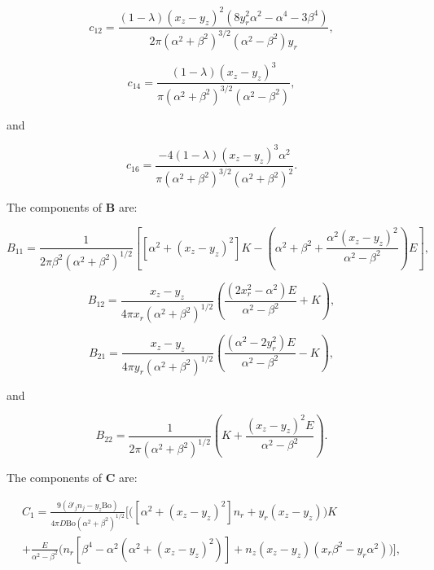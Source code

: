 \documentclass[12pt]{article}
\begin{document}
\begin{equation}
\label{equ:coeff_a12}
c_{12} = \frac{(1 - \lambda) (x_{z} - y_{z})^{2} (8 y_{r}^{2} \alpha^{2} - \alpha^{4} - 3 \beta^{4})}{2 \pi (\alpha^{2} + \beta^{2})^{3/2} (\alpha^{2} - \beta^{2}) y_{r}},
\end{equation}

\begin{equation}
\label{equ:coeff_a14}
c_{14} = \frac{(1 - \lambda) (x_{z} - y_{z})^{3}}{\pi (\alpha^{2} + \beta^{2})^{3/2} (\alpha^{2} - \beta^{2})},
\end{equation}

and 

\begin{equation}
\label{equ:coeff_a16}
c_{16} = \frac{-4 (1 - \lambda) (x_{z} - y_{z})^{3} \alpha^{2}}{\pi (\alpha^{2} + \beta^{2})^{3/2} (\alpha^{2} + \beta^{2})^{2}}.
\end{equation}

The components of $\boldsymbol{B}$ are:

\begin{equation}
\label{equ:B11_comp}
B_{11} = \frac{1}{2 \pi \beta^{2} (\alpha^{2} + \beta^{2})^{1/2}} \left[ [\alpha^{2} + (x_{z} - y_{z})^{2}] K - \left( \alpha^{2} + \beta^{2} + \frac{\alpha^{2} (x_{z} - y_{z})^{2}}{\alpha^{2} - \beta^{2}}\right) E\right],
\end{equation}


\begin{equation}
\label{equ:B12_comp}
B_{12} = \frac{x_{z} - y_{z}}{4 \pi x_{r} (\alpha^{2} + \beta^{2})^{1/2}} \left( \frac{(2 x_{r}^{2} - \alpha^{2}) E}{\alpha^{2} - \beta^{2}} + K \right),
\end{equation}

\begin{equation}
\label{equ:B21_comp}
B_{21} = \frac{x_{z} - y_{z}}{4 \pi y_{r} (\alpha^{2} + \beta^{2})^{1/2}} \left( \frac{(\alpha^{2} - 2 y_{r}^{2}) E}{\alpha^{2} - \beta^{2}} - K\right),
\end{equation}

and 

\begin{equation}
\label{equ:B22_comp}
B_{22} = \frac{1}{2 \pi (\alpha^{2} + \beta^{2})^{1/2}} \left(K + \frac{(x_{z} - y_{z})^{2} E}{\alpha^{2} - \beta^{2}}\right).
\end{equation}

The components of $\boldsymbol{C}$ are:

\begin{align}
\label{equ:C1_comp}
C_{1} = \frac{9 (\partial'_{j} n_{j} - y_{z} \text{Bo})}{4 \pi D \text{Bo} (\alpha^{2} + \beta^{2})^{1/2}} \bigg[ \bigg( [\alpha^{2} + (x_{z} - y_{z})^{2}] n_{r} + y_{r} (x_{z} - y_{z}) \bigg) K \nonumber \\
+ \frac{E}{\alpha^{2} - \beta^{2}} \bigg( n_{r} [\beta^{4} - \alpha^{2} (\alpha^{2} + (x_{z} - y_{z})^{2})] + n_{z} (x_{z} - y_{z}) (x_{r} \beta^{2} - y_{r} \alpha^{2}) \bigg) \bigg],
\end{align}
\end{document}
